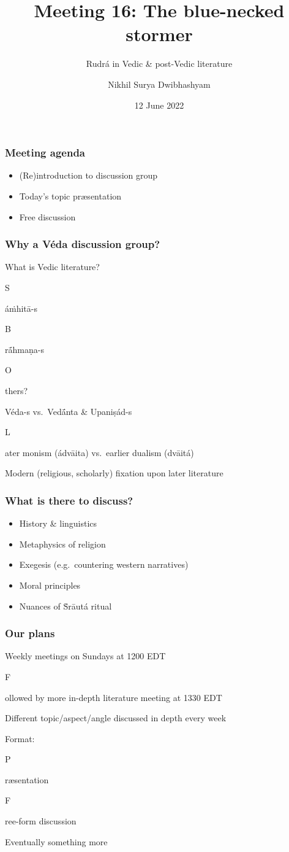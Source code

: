 \documentclass[pdf]{beamer}
\title{Meeting 16: The blue-necked stormer}
\subtitle{Rudrá in Vedic \& post-Vedic literature}
\author{Nikhil Surya Dwibhashyam}
\date{12 June 2022}
\newcommand{\Subitem}[1]{{\setlength\itemindent{12pt} \item[-] #1}}
\begin{document}
\frame{\titlepage}

\begin{frame} \frametitle{Meeting agenda}
\begin{itemize}
	\item (Re)introduction to discussion group
	\item Today's topic præsentation
	\item Free discussion
\end{itemize}
\end{frame}

\begin{frame} \frametitle{Why a Véda discussion group?}
\begin{itemize}
	\item What is Vedic literature?
	\Subitem Sáṁhitā-s
	\Subitem Brā́hmaṇa-s
	\Subitem Others?
	\item Véda-s vs.~Vedā́nta \& Upaniṣád-s
	\Subitem Later monism (ádvāita) vs.~earlier dualism (dvāitá)
	\item Modern (religious, scholarly) fixation upon later literature
\end{itemize}
\end{frame}

\begin{frame} \frametitle{What is there to discuss?}
\begin{itemize}
	\item History \& linguistics
	\item Metaphysics of religion
	\item Exegesis (e.g.~countering western narratives)
	\item Moral principles
	\item Nuances of Ṡrāutá ritual
\end{itemize}
\end{frame}

\begin{frame} \frametitle{Our plans}
\begin{itemize}
	\item Weekly meetings on Sundays at 1200 EDT
	\Subitem Followed by more in-depth literature meeting at 1330 EDT
	\item Different topic/aspect/angle discussed in depth every week
	\item Format:
	\Subitem Præsentation
	\Subitem Free-form discussion
	\item Eventually something more
\end{itemize}
\end{frame}
\end{document}

